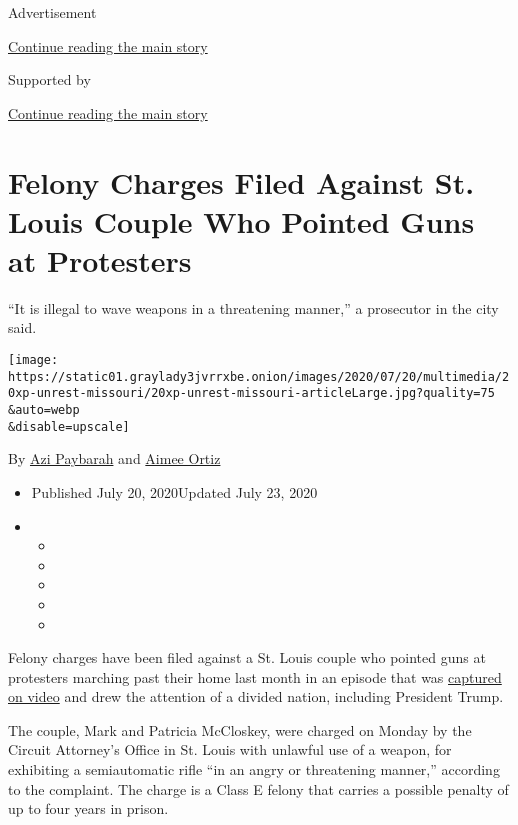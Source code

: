 Advertisement

\protect\hyperlink{after-top}{Continue reading the main story}

Supported by

\protect\hyperlink{after-sponsor}{Continue reading the main story}

\hypertarget{felony-charges-filed-against-st-louis-couple-who-pointed-guns-at-protesters}{%
\section{Felony Charges Filed Against St. Louis Couple Who Pointed Guns
at
Protesters}\label{felony-charges-filed-against-st-louis-couple-who-pointed-guns-at-protesters}}

``It is illegal to wave weapons in a threatening manner,'' a prosecutor
in the city said.

\texttt{[image: https://static01.graylady3jvrrxbe.onion/images/2020/07/20/multimedia/20xp-unrest-missouri/20xp-unrest-missouri-articleLarge.jpg?quality=75\\\&auto=webp\\\&disable=upscale]}

By \href{https://www.nytimes3xbfgragh.onion/by/azi-paybarah}{Azi
Paybarah} and
\href{https://www.nytimes3xbfgragh.onion/by/aimee-ortiz}{Aimee Ortiz}

\begin{itemize}
\item
  Published July 20, 2020Updated July 23, 2020
\item
  \begin{itemize}
  \item
  \item
  \item
  \item
  \item
  \end{itemize}
\end{itemize}

Felony charges have been filed against a St. Louis couple who pointed
guns at protesters marching past their home last month in an episode
that was \href{https://www.youtube.com/watch?v=_dOLB1K2Zio}{captured on
video} and drew the attention of a divided nation, including President
Trump.

The couple, Mark and Patricia McCloskey, were charged on Monday by the
Circuit Attorney's Office in St. Louis with unlawful use of a weapon,
for exhibiting a semiautomatic rifle ``in an angry or threatening
manner,'' according to the complaint. The charge is a Class E felony
that carries a possible penalty of up to four years in prison.

